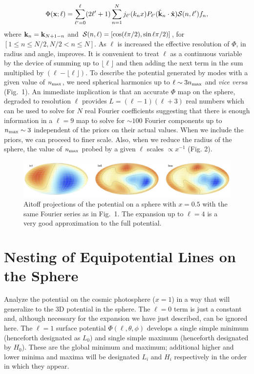 \documentclass[12pt]{article}
\begin{document}
\begin{equation}
\Phi({\bf x;\ell})=\sum_{\ell'=0} ^\ell(2\ell'+1)\sum_{n=1}^Nj_{\ell'}(k_nx)P_{\ell'}({\hat{\bf k}}_n\cdot{\hat{\bf x}}){\cal S}(n,\ell')f_n,
\end{equation}
where ${\bf k}_n={\bf k}_{N+1-n}$ and ${\cal S}(n,\ell)=[\cos(\ell\pi/2),\sin\ell\pi/2)]$, for $[1\le n\le N/2,N/2<n\le N]$. As $\ell$ is increased the effective resolution of $\Phi$, in radius and angle, improves. It is convenient to treat $\ell$ as a continuous variable by the device of summing up to $\lfloor\ell\rfloor$  and then adding the next term in the sum multiplied by $(\ell-\lfloor\ell\rfloor)$. To describe the potential generated by modes with a given value of $n_{\rm max}$, we need spherical harmonics up to $\ell\sim3n_{\rm max}$ and {\it vice versa} (Fig.~1). An immediate implication is that an accurate $\Phi$ map on the sphere, degraded to resolution $\ell$ provides $L=(\ell-1)(\ell+3)$ real numbers which can be used to solve for $N$ real Fourier coefficients suggesting that there is enough information in a $\ell=9$ map to solve for $\sim100$ Fourier components up to $n_{\rm max}\sim3$ independent of the priors on their actual values. When we include the priors, we can proceed to finer scale. Also, when we reduce the radius of the sphere, the value of $n_{\rm max}$  probed by a given $\ell$ scales $\propto x^{-1}$ (Fig. 2).

\begin{figure}[h!]
\centering
\includegraphics[width=6in]{fig2.jpg}
\caption{Aitoff projections of the potential on a sphere with $x=0.5$ with the same Fourier series as in Fig.~1. The expansion up to $\ell=4$ is a very good approximation to the full potential.}
\end{figure}

\section{Nesting of Equipotential Lines on the Sphere}
Analyze the potential on the cosmic photosphere ($x=1$) in a way that will generalize to the 3D potential in the sphere. The $\ell=0$ term is just a constant and, although necessary for the expansion we have just described, can be ignored here.  The $\ell=1$ surface potential $\Phi(\ell,\theta,\phi)$ develops a single simple minimum (henceforth designated as $L_0$) and single simple maximum (henceforth designated by $H_0$). These are the global  minimum and maximum; additional higher and lower minima and maxima will be designated $L_i$ and $H_i$ respectively in the order in which they appear.
\end{document}

